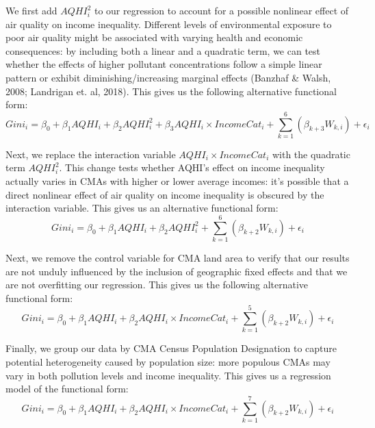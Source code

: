 \documentclass[AEJ]{AEA}
\begin{document}
We first add $AQHI_i^2$ to our regression to account for a possible nonlinear effect of air
quality on income inequality. Different levels of environmental exposure to poor
air quality might be associated with varying health and economic consequences: by 
including both a linear and a quadratic term, we can test whether the effects of
higher pollutant concentrations follow a simple linear pattern or exhibit
diminishing/increasing marginal effects (Banzhaf \& Walsh, 2008; Landrigan et. al, 2018).
This gives us the following alternative functional form:
\begin{equation}
Gini_i=\beta_0+\beta_1 AQHI_i+\beta_2 AQHI_i^2 + \beta_3 AQHI_i \times IncomeCat_i
+\sum_{k=1}^{6} \left( \beta_{k+3} W_{k,i} \right)
+ \epsilon_i
\end{equation}

Next, we replace the interaction variable $AQHI_i \times IncomeCat_i$ with the
quadratic term $AQHI_i^2$. This change tests whether AQHI’s effect on income inequality
actually varies in CMAs with higher or lower average incomes: it's possible that
a direct nonlinear effect of air quality on income inequality is obscured by
the interaction variable. This gives us an alternative functional form:
\begin{equation}
Gini_i=\beta_0+\beta_1 AQHI_i+\beta_2 AQHI_i^2
+\sum_{k=1}^{6} \left( \beta_{k+2} W_{k,i} \right)
+ \epsilon_i
\end{equation}

Next, we remove the control variable for CMA land area to verify
that our results are not unduly influenced by the inclusion of geographic fixed
effects and that we are not overfitting our regression.
This gives us the following alternative functional form:
\begin{equation}
Gini_i=\beta_0+\beta_1 AQHI_i+\beta_2 AQHI_i \times IncomeCat_i
+\sum_{k=1}^{5} \left( \beta_{k+2} W_{k,i} \right)
+ \epsilon_i
\end{equation}

Finally, we group our data by CMA Census Population Designation to capture potential
heterogeneity caused by population size: more populous CMAs may vary in both pollution
levels and income inequality. This gives us a regression model of the functional form:
\begin{equation}
Gini_i=\beta_0+\beta_1 AQHI_i+\beta_2 AQHI_i \times IncomeCat_i
+\sum_{k=1}^{7} \left( \beta_{k+2} W_{k,i} \right)
+ \epsilon_i
\end{equation}
\end{document}
